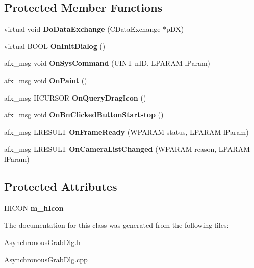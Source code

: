 \subsection*{Protected Member Functions}
\begin{DoxyCompactItemize}
\item 
\mbox{\label{class_c_asynchronous_grab_dlg_af261b91107b56f5270f84f75287b701c}} 
virtual void {\bfseries Do\+Data\+Exchange} (C\+Data\+Exchange $\ast$p\+DX)
\item 
\mbox{\label{class_c_asynchronous_grab_dlg_abfdeb6b9745c723693bac476f2bb08c5}} 
virtual B\+O\+OL {\bfseries On\+Init\+Dialog} ()
\item 
\mbox{\label{class_c_asynchronous_grab_dlg_a27d395d8013249a9474b8cf764860275}} 
afx\+\_\+msg void {\bfseries On\+Sys\+Command} (U\+I\+NT n\+ID, L\+P\+A\+R\+AM l\+Param)
\item 
\mbox{\label{class_c_asynchronous_grab_dlg_ab2ae7237273e24f043805b73e0f2308c}} 
afx\+\_\+msg void {\bfseries On\+Paint} ()
\item 
\mbox{\label{class_c_asynchronous_grab_dlg_a52181401d28bf6d2a5bb37f9122b82d3}} 
afx\+\_\+msg H\+C\+U\+R\+S\+OR {\bfseries On\+Query\+Drag\+Icon} ()
\item 
\mbox{\label{class_c_asynchronous_grab_dlg_a0fe44529e4db12f1d59842d0ea107795}} 
afx\+\_\+msg void {\bfseries On\+Bn\+Clicked\+Button\+Startstop} ()
\item 
\mbox{\label{class_c_asynchronous_grab_dlg_a93f307a8a9b94a2b214c3da1c3d3abf2}} 
afx\+\_\+msg L\+R\+E\+S\+U\+LT {\bfseries On\+Frame\+Ready} (W\+P\+A\+R\+AM status, L\+P\+A\+R\+AM l\+Param)
\item 
\mbox{\label{class_c_asynchronous_grab_dlg_a939b1c7c3ad35fd78ff395749dbc9b5e}} 
afx\+\_\+msg L\+R\+E\+S\+U\+LT {\bfseries On\+Camera\+List\+Changed} (W\+P\+A\+R\+AM reason, L\+P\+A\+R\+AM l\+Param)
\end{DoxyCompactItemize}
\subsection*{Protected Attributes}
\begin{DoxyCompactItemize}
\item 
\mbox{\label{class_c_asynchronous_grab_dlg_a26871f858f6a7157b6b2ccb765e37620}} 
H\+I\+C\+ON {\bfseries m\+\_\+h\+Icon}
\end{DoxyCompactItemize}


The documentation for this class was generated from the following files\+:\begin{DoxyCompactItemize}
\item 
Asynchronous\+Grab\+Dlg.\+h\item 
Asynchronous\+Grab\+Dlg.\+cpp\end{DoxyCompactItemize}
